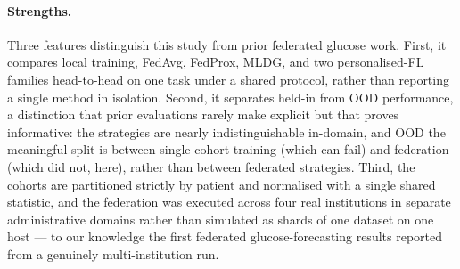 \documentclass[10pt,letterpaper]{article}
\begin{document}
\paragraph{Strengths.} Three features distinguish this study from prior federated
glucose work. First, it compares local training, FedAvg, FedProx, MLDG, and two
personalised-FL families head-to-head on one task under a shared protocol, rather
than reporting a single method in isolation. Second, it separates held-in from
OOD performance, a distinction that prior evaluations rarely make explicit but
that proves informative: the strategies are nearly indistinguishable in-domain,
and OOD the meaningful split is between single-cohort training (which can fail)
and federation (which did not, here), rather than between federated strategies.
Third, the cohorts are partitioned strictly by patient and normalised with a
single shared statistic, and the federation was executed across four real
institutions in separate administrative domains rather than simulated as shards of
one dataset on one host --- to our knowledge the first federated glucose-forecasting
results reported from a genuinely multi-institution run.
\end{document}
